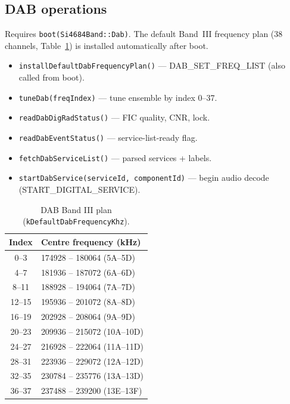 \subsection{DAB operations}

Requires \texttt{boot(Si4684Band::Dab)}. The default Band~III frequency plan
(38 channels, Table~\ref{tab:si4684-dab-plan}) is installed automatically
after boot.

\begin{itemize}
  \item \texttt{installDefaultDabFrequencyPlan()} --- DAB\_SET\_FREQ\_LIST
    (also called from boot).
  \item \texttt{tuneDab(freqIndex)} --- tune ensemble by index 0--37.
  \item \texttt{readDabDigRadStatus()} --- FIC quality, CNR, lock.
  \item \texttt{readDabEventStatus()} --- service-list-ready flag.
  \item \texttt{fetchDabServiceList()} --- parsed services + labels.
  \item \texttt{startDabService(serviceId, componentId)} --- begin audio
    decode (START\_DIGITAL\_SERVICE).
\end{itemize}

\begin{table}[htbp]
  \centering
  \small
  \begin{tabular}{@{}cl@{}}
    \toprule
    \textbf{Index} & \textbf{Centre frequency (kHz)} \\
    \midrule
    0--3   & 174928 -- 180064 (5A--5D) \\
    4--7   & 181936 -- 187072 (6A--6D) \\
    8--11  & 188928 -- 194064 (7A--7D) \\
    12--15 & 195936 -- 201072 (8A--8D) \\
    16--19 & 202928 -- 208064 (9A--9D) \\
    20--23 & 209936 -- 215072 (10A--10D) \\
    24--27 & 216928 -- 222064 (11A--11D) \\
    28--31 & 223936 -- 229072 (12A--12D) \\
    32--35 & 230784 -- 235776 (13A--13D) \\
    36--37 & 237488 -- 239200 (13E--13F) \\
    \bottomrule
  \end{tabular}
  \caption{DAB Band III plan (\texttt{kDefaultDabFrequencyKhz}).}
  \label{tab:si4684-dab-plan}
\end{table}

